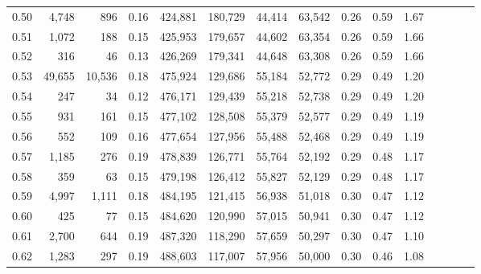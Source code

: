 \begin{tabular}{rrrcrrrrrrrrrrr}
0.50 &   4,748 &     896 &                                       0.16 &  424,881 &  180,729 &   44,414 &   63,542 &  0.26 &  0.59 &                         1.67 \\
0.51 &   1,072 &     188 &                                       0.15 &  425,953 &  179,657 &   44,602 &   63,354 &  0.26 &  0.59 &                         1.66 \\
0.52 &     316 &      46 &                                       0.13 &  426,269 &  179,341 &   44,648 &   63,308 &  0.26 &  0.59 &                         1.66 \\
0.53 &  49,655 &  10,536 &                                       0.18 &  475,924 &  129,686 &   55,184 &   52,772 &  0.29 &  0.49 &                         1.20 \\
0.54 &     247 &      34 &                                       0.12 &  476,171 &  129,439 &   55,218 &   52,738 &  0.29 &  0.49 &                         1.20 \\
0.55 &     931 &     161 &                                       0.15 &  477,102 &  128,508 &   55,379 &   52,577 &  0.29 &  0.49 &                         1.19 \\
0.56 &     552 &     109 &                                       0.16 &  477,654 &  127,956 &   55,488 &   52,468 &  0.29 &  0.49 &                         1.19 \\
0.57 &   1,185 &     276 &                                       0.19 &  478,839 &  126,771 &   55,764 &   52,192 &  0.29 &  0.48 &                         1.17 \\
0.58 &     359 &      63 &                                       0.15 &  479,198 &  126,412 &   55,827 &   52,129 &  0.29 &  0.48 &                         1.17 \\
0.59 &   4,997 &   1,111 &                                       0.18 &  484,195 &  121,415 &   56,938 &   51,018 &  0.30 &  0.47 &                         1.12 \\
0.60 &     425 &      77 &                                       0.15 &  484,620 &  120,990 &   57,015 &   50,941 &  0.30 &  0.47 &                         1.12 \\
0.61 &   2,700 &     644 &                                       0.19 &  487,320 &  118,290 &   57,659 &   50,297 &  0.30 &  0.47 &                         1.10 \\
0.62 &   1,283 &     297 &                                       0.19 &  488,603 &  117,007 &   57,956 &   50,000 &  0.30 &  0.46 &                         1.08 \\

\end{tabular}
